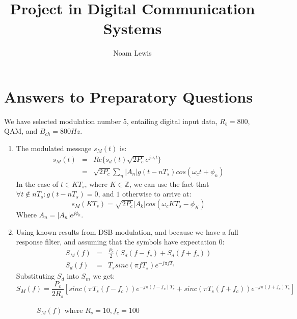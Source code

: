 \documentclass[onecolumn,technote,twoside,a4paper,10pt,english]{IEEEtran}
\begin{document}
\title{Project in Digital Communication Systems}
\author{Noam Lewis}

\maketitle

\section{Answers to Preparatory Questions}

We have selected modulation number 5, entailing digital input data, $R_b=800$, QAM, and $B_{ch}=800Hz$.

\begin{enumerate}
\item The modulated message $s_M(t)$ is:
  \begin{eqnarray}
    \label{eq:s_M}
    s_M(t) &=& Re\{s_d(t)\sqrt{2P_c}e^{j\omega_c t}\} \\
    &=& \sqrt{2P_c}\sum_n{|A_n| g(t-n T_s) cos(\omega_ct + \phi_n)}
  \end{eqnarray}
  In the case of $t \in K T_s$, where $K \in \mathbb{Z}$, we can use the fact that $\forall t \notin n T_s : g(t-n T_s)=0$, and $1$ otherwise to arrive at:
  \begin{equation}
    s_M(K T_s) = \sqrt{2P_c}|A_k|cos(\omega_c K T_s - \phi_K)
  \end{equation}
  Where  $A_n=|A_n|e^{j\phi_n}$.
\item Using known results from DSB modulation, and because we have a full response filter, and assuming that the symbols have expectation $0$:
  \begin{eqnarray}
    S_M(f) &=& \frac{P_c}{2}(S_d(f-f_c)+S_d(f+f_c)) \\
    S_d(f) &=& T_s sinc(\pi f T_s)e^{-j\pi f T_s}
  \end{eqnarray}
  Substituting $S_d$ into $S_m$ we get:
  \begin{equation}
    \label{eq:S_M(f)}
    S_M(f) = \frac{P_c}{2R_s}\left[ sinc(\pi T_s(f-f_c)) e^{-j\pi(f-f_c)T_s} 
                           + sinc (\pi T_s(f+f_c))e^{-j\pi(f+f_c)T_s} \right]
  \end{equation}
  \begin{figure}[h]
    \label{fig:S_M(f)}
    \centering
    
    \caption{$S_M(f)$ where $R_s=10,f_c=100$}
  \end{figure}


\end{enumerate}
\end{document}
